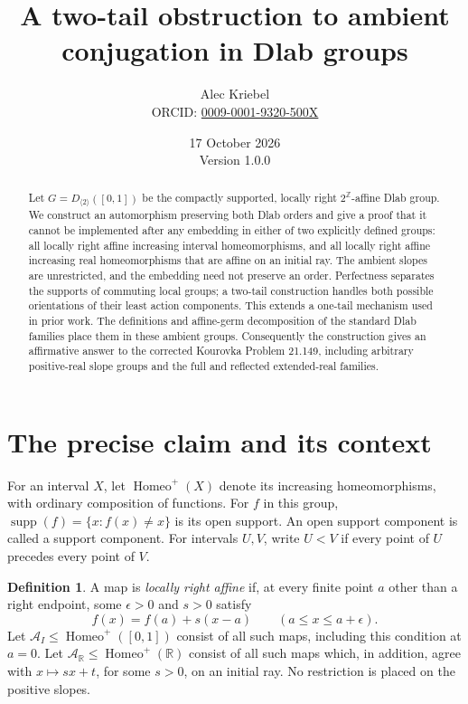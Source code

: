 \documentclass[10pt]{article}
\title{A two-tail obstruction to ambient conjugation in Dlab groups}
\author{Alec Kriebel\\
\small ORCID: \href{https://orcid.org/0009-0001-9320-500X}{0009-0001-9320-500X}}
\date{17 October 2026\\[3pt]
\small Version 1.0.0}
\theoremstyle{definition}
\newtheorem{definition}[theorem]{Definition}
\newcommand{\R}{\mathbb R}
\newcommand{\Z}{\mathbb Z}
\newcommand{\supp}{\operatorname{supp}}
\newcommand{\Homeo}{\operatorname{Homeo}}
\newcommand{\AI}{\mathcal A_I}
\newcommand{\AR}{\mathcal A_{\R}}
\begin{document}
\maketitle

\begin{abstract}
Let $G=D_{\langle2\rangle}([0,1])$ be the compactly supported,
locally right $2^{\Z}$-affine Dlab group. We construct an automorphism
preserving both Dlab orders and give a proof that it cannot be implemented
after any embedding in either of two explicitly defined groups: all locally
right affine increasing interval homeomorphisms, and all locally right
affine increasing real homeomorphisms that are affine on an initial ray.
The ambient slopes are unrestricted, and the embedding need not preserve
an order. Perfectness separates the supports of commuting local groups;
a two-tail construction handles both possible orientations of their least
action components. This extends a one-tail mechanism used in prior work.
The definitions and affine-germ decomposition of the standard Dlab
families place them in these ambient groups. Consequently the construction
gives an affirmative answer to the corrected Kourovka Problem 21.149,
including arbitrary positive-real slope groups and the full and reflected
extended-real families.
\end{abstract}

\section{The precise claim and its context}

For an interval $X$, let $\Homeo^+(X)$ denote its increasing
homeomorphisms, with ordinary composition of functions. For $f$ in this
group, $\supp(f)=\{x:f(x)\ne x\}$ is its open support. An open support
component is called a support component. For intervals $U,V$, write $U<V$
if every point of $U$ precedes every point of $V$.

\begin{definition}
A map is \emph{locally right affine} if, at every finite point $a$ other
than a right endpoint, some $\epsilon>0$ and $s>0$ satisfy
\[
 f(x)=f(a)+s(x-a)\qquad(a\le x\le a+\epsilon).
\]
Let $\AI\le\Homeo^+([0,1])$ consist of all such maps, including this
condition at $a=0$. Let $\AR\le\Homeo^+(\R)$ consist of all such maps
which, in addition, agree with $x\mapsto sx+t$, for some $s>0$, on an
initial ray. No restriction is placed on the positive slopes.
\end{definition}
\end{document}
